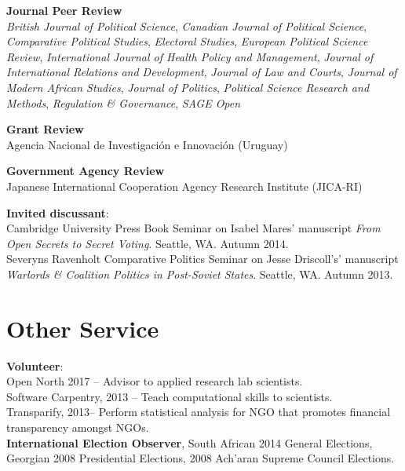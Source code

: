 \documentclass[margin,line]{res}
\begin{document}
{\begin{resume}
\textbf{Journal Peer Review}\\
\emph{British Journal of Political Science},
\emph{Canadian Journal
  of Political Science},
\emph{Comparative Political Studies},
\emph{Electoral Studies},
\emph{European Political Science Review},
\emph{International Journal of Health Policy and Management},
\emph{Journal of International Relations and Development},
\emph{Journal of Law and Courts},
\emph{Journal of Modern African Studies},
\emph{Journal of Politics},
\emph{Political Science Research and Methods},
\emph{Regulation \& Governance},
\emph{SAGE Open}
\par\smallskip

\textbf{Grant Review}\\
Agencia Nacional de Investigaci\'on e Innovaci\'on (Uruguay)

\textbf{Government Agency Review}\\
Japanese International Cooperation Agency Research Institute (JICA-RI)


\textbf{Invited discussant}: \\
  Cambridge University Press Book Seminar on
Isabel Mares' manuscript \emph{From Open Secrets to Secret Voting}. Seattle, WA. Autumn 2014. \\
 Severyns Ravenholt Comparative Politics Seminar on
Jesse Driscoll's' manuscript \emph{Warlords \& Coalition Politics in
  Post-Soviet States}. Seattle, WA. Autumn 2013. \par\smallskip





\section{\sc  Other Service}
\textbf{Volunteer}: \\
Open North 2017 -- Advisor to applied research lab
scientists.\\
Software Carpentry, 2013 -- 
Teach computational skills to
scientists.\\
Transparify, 2013--
 Perform statistical analysis for NGO that promotes
financial transparency amongst NGOs.  \\
\textbf{International Election Observer}, South African 2014 General
Elections, Georgian 2008 Presidential Elections, 2008 Ach'aran Supreme
Council Elections. 


\end{resume}}
\end{document}
